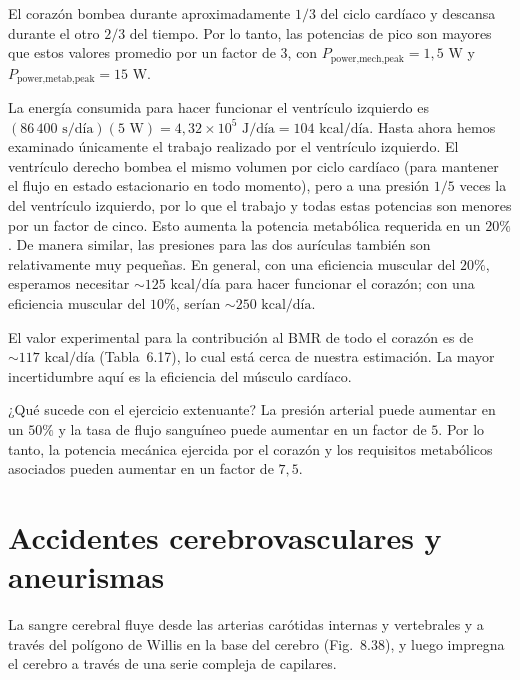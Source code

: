 \documentclass[12pt]{book}
\begin{document}
El corazón bombea durante aproximadamente $1/3$ del ciclo cardíaco y descansa durante el otro $2/3$ del tiempo. Por lo tanto, las potencias de pico son mayores que estos valores promedio por un factor de $3$, con $P_{\text{power,mech,peak}} = 1{,}5\text{ W}$ y $P_{\text{power,metab,peak}} = 15\text{ W}$.

La energía consumida para hacer funcionar el ventrículo izquierdo es $(86\,400\text{ s/d\'{i}a})(5\text{ W}) = 4{,}32 \times 10^5\text{ J/d\'{i}a} = 104\text{ kcal/d\'{i}a}$. Hasta ahora hemos examinado únicamente el trabajo realizado por el ventrículo izquierdo. El ventrículo derecho bombea el mismo volumen por ciclo cardíaco (para mantener el flujo en estado estacionario en todo momento), pero a una presión $1/5$ veces la del ventrículo izquierdo, por lo que el trabajo y todas estas potencias son menores por un factor de cinco. Esto aumenta la potencia metabólica requerida en un $20\%$. De manera similar, las presiones para las dos aurículas también son relativamente muy pequeñas. En general, con una eficiencia muscular del $20\%$, esperamos necesitar ${\sim}125\text{ kcal/d\'{i}a}$ para hacer funcionar el corazón; con una eficiencia muscular del $10\%$, serían ${\sim}250\text{ kcal/d\'{i}a}$.

El valor experimental para la contribución al BMR de todo el corazón es de ${\sim}117\text{ kcal/d\'{i}a}$ (Tabla~6.17), lo cual está cerca de nuestra estimación. La mayor incertidumbre aquí es la eficiencia del músculo cardíaco.

¿Qué sucede con el ejercicio extenuante? La presión arterial puede aumentar en un $50\%$ y la tasa de flujo sanguíneo puede aumentar en un factor de $5$. Por lo tanto, la potencia mecánica ejercida por el corazón y los requisitos metabólicos asociados pueden aumentar en un factor de $7{,}5$.

\section{Accidentes cerebrovasculares y aneurismas}

La sangre cerebral fluye desde las arterias carótidas internas y vertebrales y a través del polígono de Willis en la base del cerebro (Fig.~8.38), y luego impregna el cerebro a través de una serie compleja de capilares.
\end{document}
